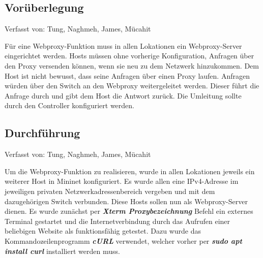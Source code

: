 \documentclass[fontsize=12pt,paper=a4,open=any,parskip=half,
  twoside=false,toc=listof,toc=bibliography,fleqn,leqno,
  captions=nooneline,captions=tableabove,british]{scrbook}
\begin{document}
\subsection{Vorüberlegung}
{\tiny Verfasst von: Tung, Naghmeh, James, Mücahit\par}
Für eine Webproxy-Funktion muss in allen Lokationen ein Webproxy-Server eingerichtet werden. Hosts müssen ohne vorherige Konfiguration, Anfragen über den Proxy versenden können, wenn sie neu zu dem Netzwerk hinzukommen. Dem Host ist nicht bewusst, dass seine Anfragen über einen Proxy laufen. Anfragen würden über den Switch an den Webproxy weitergeleitet werden. Dieser führt die Anfrage durch und gibt dem Host die Antwort zurück. Die Umleitung sollte durch den Controller konfiguriert werden. 

\subsection{Durchführung}
{\tiny Verfasst von: Tung, Naghmeh, James, Mücahit\par}
Um die Webproxy-Funktion zu realisieren, wurde in allen Lokationen jeweils ein weiterer Host in Mininet konfiguriert. Es wurde allen eine IPv4-Adresse im jeweiligen privaten Netzwerkadressenbereich vergeben und mit dem dazugehörigen Switch verbunden. Diese Hosts sollen nun als Webproxy-Server dienen. Es wurde zunächst per \textit{\textbf{Xterm Proxybezeichnung}} Befehl ein externes Terminal gestartet und die Internetverbindung durch das Aufrufen einer beliebigen Website als funktionsfähig getestet. Dazu wurde das Kommandozeilenprogramm \textit{\textbf{cURL}} verwendet, welcher vorher per \textit{\textbf{sudo apt install curl}} installiert werden muss.
\end{document}
